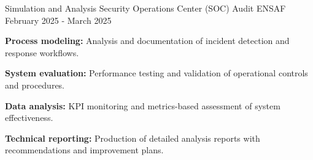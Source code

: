 \begin{cventries}
    \cventry
    {Simulation and Analysis}
    {Security Operations Center (SOC) Audit} %
    {ENSAF} %
    {February 2025 - March 2025} %
    {
        \begin{cvitems}
            \item {
                        \textbf{Process modeling:} Analysis and documentation of incident detection and response workflows.}
            \item {
                        \textbf{System evaluation:} Performance testing and validation of operational controls and procedures.}
            \item {
                        \textbf{Data analysis:} KPI monitoring and metrics-based assessment of system effectiveness.}
            \item {
                        \textbf{Technical reporting:} Production of detailed analysis reports with recommendations and improvement plans.}
        \end{cvitems}
    }

\end{cventries}

